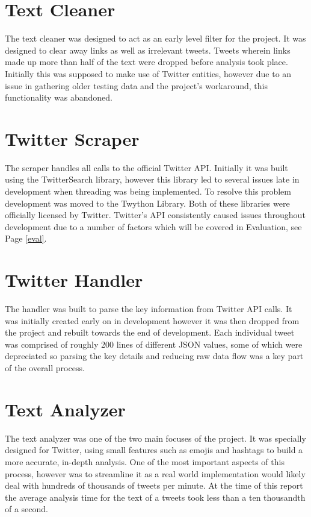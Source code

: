 \documentclass[12pt,a4paper]{report}
\begin{document}
  \section{Text Cleaner}
  The text cleaner was designed to act as an early level filter for the project. It was designed to clear away links as well as irrelevant tweets. Tweets wherein links made up more than half of the text were dropped before analysis took place. Initially this was supposed to make use of Twitter entities, however due to an issue in gathering older testing data and the project’s workaround, this functionality was abandoned.
  \section{Twitter Scraper}
  The scraper handles all calls to the official Twitter API. Initially it was built using the TwitterSearch\cite{TwitterSearch} library, however this library led to several issues late in development when threading was being implemented. To resolve this problem development was moved to the Twython\cite{Twython} Library. Both of these libraries were officially licensed by Twitter. Twitter’s API consistently caused issues throughout development due to a number of factors which will be covered in Evaluation, see Page \ref{eval}.
  \section{Twitter Handler}
  The handler was built to parse the key information from Twitter API calls. It was initially created early on in development however it was then dropped from the project and rebuilt towards the end of development. Each individual tweet was comprised of roughly 200 lines of different JSON values, some of which were depreciated so parsing the key details and reducing raw data flow was a key part of the overall process.
  \section{Text Analyzer}
  The text analyzer was one of the two main focuses of the project. It was specially designed for Twitter, using small features such as emojis and hashtags to build a more accurate, in-depth analysis. One of the most important aspects of this process, however was to streamline it as a real world implementation would likely deal with hundreds of thousands of tweets per minute. At the time of this report the average analysis time for the text of a tweets took less than a ten thousandth of a second.
\end{document}
